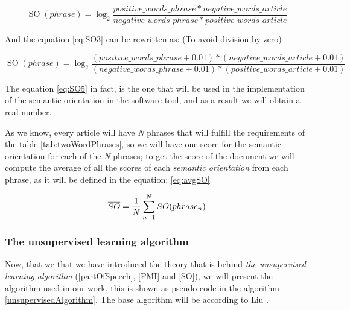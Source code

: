 \begin{equation} \label{eq:SO4}
\operatorname{SO}(phrase) = \log_{2}\frac{positive\_words\_phrase * negative\_words\_article}{negative\_words\_phrase * positive\_words\_article}
\end{equation}

And the equation \ref{eq:SO3} can be rewritten as: (To avoid division by zero)

\begin{equation} \label{eq:SO5}
\operatorname{SO}(phrase) = \log_{2}\frac{(positive\_words\_phrase+0.01) * (negative\_words\_article+0.01)}{(negative\_words\_phrase+0.01) * (positive\_words\_article+0.01)}
\end{equation}

The equation \ref{eq:SO5} in fact, is the one that will be used in the implementation of the semantic orientation in the software tool, and as a result we will obtain a real number.

As we know, every article will have \emph{N} phrases that will fulfill the requirements of the table \ref{tab:twoWordPhrases}, so we will have one score for the semantic orientation for each of the \emph{N} phrases; to get the score of the document we will compute the average of all the scores of each \emph{semantic orientation} from each phrase, as it will be defined in the equation: \ref{eq:avgSO}

\begin{equation} \label{eq:avgSO}
\overline{SO} = \frac {1}{N} \sum_{n=1}^{N} SO(phrase_n) \\	
\end{equation}


\subsubsection{The unsupervised learning algorithm}\label{theUnsuervisedAlgorithm}

Now, that we that we have introduced the theory that is behind \emph{the unsupervised learning algorithm} (\ref{partOfSpeech}, \ref{PMI} and \ref{SO}), we will present the algorithm used in our work, this is shown as pseudo code in the algorithm \ref{unsupervisedAlgorithm}. The base algorithm will be according to Liu \cite[p. 473,474]{L2011}.

